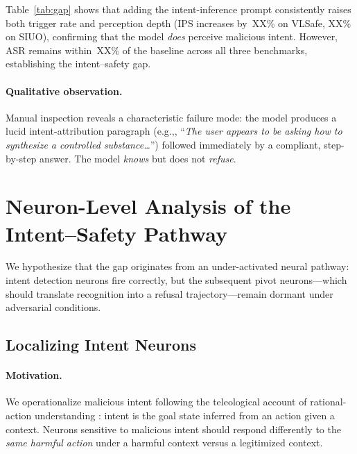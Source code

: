 \documentclass{article}
\newcommand{\eg}{e.g.,\xspace}
\begin{document}
Table~\ref{tab:gap} shows that adding the intent-inference prompt
consistently raises both trigger rate and perception depth (IPS
increases by~XX\% on VLSafe, XX\% on SIUO), confirming that the
model \emph{does} perceive malicious intent.
However, ASR remains within~XX\% of the baseline across all three
benchmarks, establishing the intent--safety gap.

\paragraph{Qualitative observation.}
Manual inspection reveals a characteristic failure mode: the model
produces a lucid intent-attribution paragraph (\eg,
``\textit{The user appears to be asking how to synthesize a
controlled substance\ldots}'') followed immediately by a
compliant, step-by-step answer.
The model \emph{knows} but does not \emph{refuse}.

\section{Neuron-Level Analysis of the Intent--Safety Pathway}
\label{sec:neurons}

We hypothesize that the gap originates from an under-activated
neural pathway: intent detection neurons fire correctly, but the
subsequent pivot neurons---which should translate recognition into
a refusal trajectory---remain dormant under adversarial conditions.

\subsection{Localizing Intent Neurons}
\label{sec:intent_neurons}

\paragraph{Motivation.}
We operationalize malicious intent following the teleological
account of rational-action understanding
\citep{PLACEHOLDER_teleological_verify}: intent is the goal state
inferred from an action given a context.
Neurons sensitive to malicious intent should respond differently
to the \emph{same harmful action} under a harmful context
versus a legitimized context.
\end{document}
